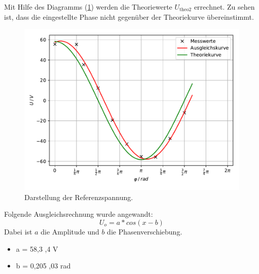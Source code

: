 Mit Hilfe des Diagramms (\ref{abb:5}) werden die Theoriewerte $U_\text{theo2}$ errechnet.
Zu sehen ist, dass die eingestellte Phase nicht gegenüber der Theoriekurve übereinstimmt.
\begin{figure}[H]
	\centering
	\includegraphics[width=\textwidth]{kurve1.pdf}
	\caption{Darstellung der Referenzspannung.}
	\label{abb:5}
\end{figure}
Folgende Ausgleichsrechnung wurde angewandt:
\begin{equation*}
	 U_o = a * cos(x - b)
 \end{equation*}
Dabei ist $a$ die Amplitude und $b$ die Phasenverschiebung.
\begin{itemize}
	\item a = 58,3 ,4 V
	\item b = 0,205 ,03 rad
\end{itemize}

